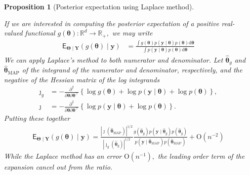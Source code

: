 \documentclass[
  11pt,
  letterpaper,
]{scrbook}
\theoremstyle{definition}
\theoremstyle{plain}
\newtheorem{proposition}{Proposition}[chapter]
\theoremstyle{plain}
\theoremstyle{plain}
\theoremstyle{definition}
\theoremstyle{definition}
\theoremstyle{plain}
\newtheorem{proposition}{Proposition}[chapter]
\theoremstyle{plain}
\theoremstyle{remark}
\begin{document}
\begin{proposition}[Posterior expectation using Laplace
method]\protect\hypertarget{prp-expectation-Laplace}{}\label{prp-expectation-Laplace}

If we are interested in computing the posterior expectation of a
positive real-valued functional
\(g(\boldsymbol{\theta}): \mathbb{R}^d \to \mathbb{R}_{+},\) we may
write \begin{align*}
 \mathsf{E}_{\boldsymbol{\Theta} \mid \boldsymbol{Y}}(g(\boldsymbol{\theta}) \mid \boldsymbol{y}) &=  \frac{\int g(\boldsymbol{\theta}) p(\boldsymbol{y} \mid \boldsymbol{\theta}) p( \boldsymbol{\theta}) \mathrm{d} \boldsymbol{\theta}}{\int p(\boldsymbol{y} \mid \boldsymbol{\theta})p( \boldsymbol{\theta}) \mathrm{d} \boldsymbol{\theta}}
\end{align*} We can apply Laplace's method to both numerator and
denominator. Let \(\widehat{\boldsymbol{\theta}}_g\) and
\(\widehat{\boldsymbol{\theta}}_{\mathrm{MAP}}\) of the integrand of the
numerator and denominator, respectively, and the negative of the Hessian
matrix of the log integrands \begin{align*}
\jmath_g&=  -\frac{\partial^2}{\partial \boldsymbol{\theta}\partial \boldsymbol{\theta}^\top} \left\{ \log g(\boldsymbol{\theta}) + \log p(\boldsymbol{y} \mid \boldsymbol{\theta}) + \log p(\boldsymbol{\theta})\right\}, \\
\jmath &=  -\frac{\partial^2}{\partial \boldsymbol{\theta}\partial \boldsymbol{\theta}^\top} \left\{\log p(\boldsymbol{y} \mid \boldsymbol{\theta}) + \log p(\boldsymbol{\theta})\right\}.
\end{align*} Putting these together \begin{align*}
\mathsf{E}_{\boldsymbol{\Theta} \mid \boldsymbol{Y}}(g(\boldsymbol{\theta}) \mid \boldsymbol{y}) = \frac{|\jmath(\widehat{\boldsymbol{\theta}}_{\mathrm{MAP}})|^{1/2}}{|\jmath_g(\widehat{\boldsymbol{\theta}}_g)|^{1/2}} \frac{g(\widehat{\boldsymbol{\theta}}_g) p(\boldsymbol{y} \mid \widehat{\boldsymbol{\theta}}_g) p( \widehat{\boldsymbol{\theta}}_g)}{p(\boldsymbol{y} \mid \widehat{\boldsymbol{\theta}}_{\mathrm{MAP}}) p(\widehat{\boldsymbol{\theta}}_{\mathrm{MAP}})} + \mathrm{O}(n^{-2})
\end{align*} While the Laplace method has an error
\(\mathrm{O}(n^{-1}),\) the leading order term of the expansion cancel
out from the ratio.

\end{proposition}
\end{document}
